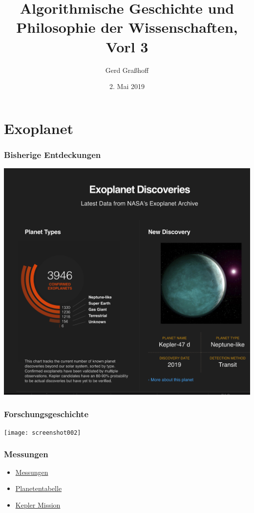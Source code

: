 \documentclass[11pt]{beamer}
\author{Gerd Graßhoff}
\title{Algorithmische Geschichte und Philosophie der Wissenschaften, Vorl 3}
\date{2. Mai 2019}
\begin{document}
	\begin{frame}[plain]
		\maketitle
	\end{frame}
	

\section{Exoplanet}

\begin{frame}
	\frametitle{Bisherige Entdeckungen}
	\centering
	\href{https://exoplanets.nasa.gov/}{\includegraphics[width=1\linewidth]{screenshot001}}
	
\end{frame}

\begin{frame}
	\frametitle{Forschungsgeschichte}
	\centering
	\texttt{[image: screenshot002]}
\end{frame}


\begin{frame}
	\frametitle{Messungen}
	
	\begin{itemize}
		\item\href{https://exoplanets.nasa.gov/5-ways-to-find-a-planet/}{Messungen}
		\item\href{https://exoplanetarchive.ipac.caltech.edu/cgi-bin/TblView/nph-tblView?app=ExoTbls&config=planets}{Planetentabelle}
		\item\href{https://www.nasa.gov/mission_pages/kepler/overview/index.html}{Kepler Mission}
	\end{itemize}
\end{frame}
\end{document}
